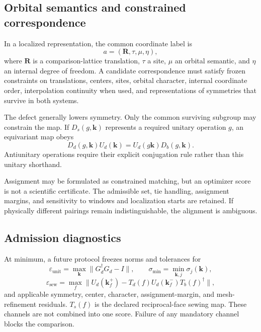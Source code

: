 \documentclass[11pt]{article}
\newenvironment{prospective}{\color{prospectivered}}{}
\begin{document}
\begin{prospective}
\subsection{Orbital semantics and constrained correspondence}
In a localized representation, the common coordinate label is
\begin{equation}
 a=(\mathbf R,\tau,\mu,\eta),
\end{equation}
where $\mathbf R$ is a comparison-lattice translation, $\tau$ a site, $\mu$ an orbital
semantic, and $\eta$ an internal degree of freedom. A candidate correspondence must
satisfy frozen constraints on translations, centers, sites, orbital character, internal
coordinate order, interpolation continuity when used, and representations of symmetries
that survive in both systems.

The defect generally lowers symmetry. Only the common surviving subgroup may constrain
the map. If $D_s(g,\mathbf k)$ represents a required unitary operation $g$, an equivariant
map obeys
\begin{equation}
 D_d(g,\mathbf k)U_d(\mathbf k)
 =U_d(g\mathbf k)D_b(g,\mathbf k).
\end{equation}
Antiunitary operations require their explicit conjugation rule rather than this unitary
shorthand.

Assignment may be formulated as constrained matching, but an optimizer score is not a
scientific certificate. The admissible set, tie handling, assignment margins, and
sensitivity to windows and localization starts are retained. If physically different
pairings remain indistinguishable, the alignment is ambiguous.

\subsection{Admission diagnostics}
At minimum, a future protocol freezes norms and tolerances for
\begin{equation}
 \varepsilon_{\mathrm{unit}}
 =\max_{\mathbf k}\lVert G_d^\dagger G_d-I\rVert,
 \qquad
 \sigma_{\min}=\min_{\mathbf k,j}\sigma_j(\mathbf k),
\end{equation}
\begin{equation}
 \varepsilon_{\mathrm{sew}}
 =\max_f\lVert U_d(\mathbf k_f^+)
 -T_d(f)U_d(\mathbf k_f^-)T_b(f)^\dagger\rVert,
\end{equation}
and applicable symmetry, center, character, assignment-margin, and mesh-refinement
residuals. $T_s(f)$ is the declared reciprocal-face sewing map. These channels are not
combined into one score. Failure of any mandatory channel blocks the comparison.


\end{prospective}
\end{document}
